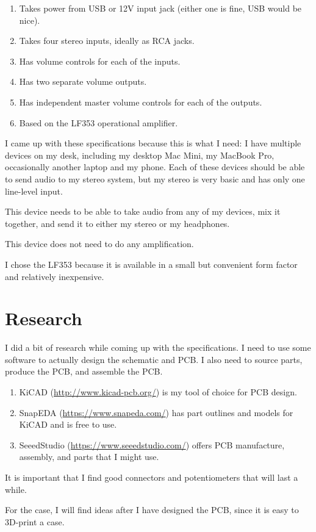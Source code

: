 \documentclass[a4paper]{article}
\begin{document}
\begin{enumerate}
  \item Takes power from USB or 12V input jack (either one is fine, USB would be nice).
  \item Takes four stereo inputs, ideally as RCA jacks.
  \item Has volume controls for each of the inputs.
  \item Has two separate volume outputs.
  \item Has independent master volume controls for each of the outputs.
  \item Based on the LF353 operational amplifier.
\end{enumerate}

I came up with these specifications because this is what I need: I have multiple devices on my desk, including my desktop Mac Mini, my MacBook Pro, occasionally another laptop and my phone. Each of these devices should be able to send audio to my stereo system, but my stereo is very basic and has only one line-level input.

This device needs to be able to take audio from any of my devices, mix it together, and send it to either my stereo or my headphones.

This device does not need to do any amplification.

I chose the LF353 because it is available in a small but convenient form factor and relatively inexpensive. 

\section{Research}

I did a bit of research while coming up with the specifications. I need to use some software to actually design the schematic and PCB. I also need to source parts, produce the PCB, and assemble the PCB.

\begin{enumerate}
  \item KiCAD (\url{http://www.kicad-pcb.org/}) is my tool of choice for PCB design.
  \item SnapEDA (\url{https://www.snapeda.com/}) has part outlines and models for KiCAD and is free to use.
  \item SeeedStudio (\url{https://www.seeedstudio.com/}) offers PCB manufacture, assembly, and parts that I might use.
\end{enumerate}

It is important that I find good connectors and potentiometers that will last a while.

For the case, I will find ideas after I have designed the PCB, since it is easy to 3D-print a case.
\end{document}
